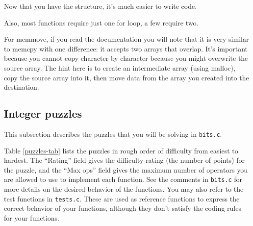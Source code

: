 \documentclass[11pt]{article}
\begin{document}
 Now that you have the structure, it's much easier to write code.
 
 Also, most functions require just one for loop, a few require two.
 

 For memmove, if you read the documentation you will note that it is very similar to memcpy with one difference: it accepts two arrays that overlap. It's important because you cannot copy character by character because you might overwrite the source array. The hint here is to create an intermediate array (using malloc), copy the source array into it, then move data from the array you created into the destination.

\subsection{Integer puzzles}

This subsection describes the puzzles that you will be solving in {\tt bits.c}.

Table \ref{puzzles-tab} lists the puzzles in rough order of
difficulty from easiest to hardest. The ``Rating'' field gives the
difficulty rating (the number of points) for the puzzle, and the ``Max
ops'' field gives the maximum number of operators you are allowed to
use to implement each function.  See the comments in {\tt bits.c} for
more details on the desired behavior of the functions. You may also
refer to the test functions in {\tt tests.c}.  These are used as
reference functions to express the correct behavior of your functions,
although they don't satisfy the coding rules for your functions.
\end{document}
